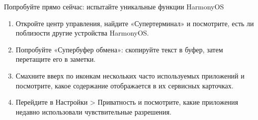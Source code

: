\begin{tcbpractice}{Попробуйте прямо сейчас: испытайте уникальные функции HarmonyOS}
\begin{enumerate}
  \item Откройте центр управления, найдите «Супертерминал» и посмотрите, есть ли поблизости другие устройства HarmonyOS.
  \item Попробуйте «Супербуфер обмена»: скопируйте текст в буфер, затем перетащите его в заметки.
  \item Смахните вверх по иконкам нескольких часто используемых приложений и посмотрите, какое содержание отображается в их сервисных карточках.
  \item Перейдите в Настройки > Приватность и посмотрите, какие приложения недавно использовали чувствительные разрешения.
\end{enumerate}

\end{tcbpractice}
